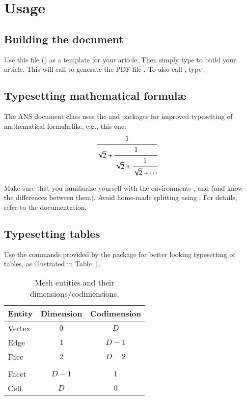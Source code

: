 \documentclass{ansarticle}
\begin{document}
\section{Usage}

\subsection{Building the document}

Use this file () as a template for your article. Then
simply type  to build your article. This will call
 to generate the PDF file . To also call
, type .

\subsection{Typesetting mathematical formul\ae}

The ANS document class uses the  and 
packages for improved typesetting of mathematical formul\ae like,
e.g., this one:
\begin{equation}
  \cfrac{1}{\sqrt{2}+
    \cfrac{1}{\sqrt{2}+
      \cfrac{1}{\sqrt{2}+\dotsb
  }}}.
\end{equation}

Make sure that you familiarize yourself with the 
environments ,  and  (and know the
differences between them). Avoid home-made splitting using
. For details, refer to the 
documentation.

\subsection{Typesetting tables}

Use the commands provided by the  package for better
looking typesetting of tables, as illustrated in
Table~\ref{tab:tableexample}.

\begin{table}
  \begin{center}
    \begin{tabular}{lcc}
      \toprule
      Entity & Dimension & Codimension \\
      \hline
      Vertex & $0$ & $D$ \\
      Edge & $1$ & $D-1$ \\
      Face & $2$ & $D-2$ \\
      & & \\
      Facet & $D-1$ & $1$ \\
      Cell & $D$ & $0$ \\
      \bottomrule
    \end{tabular}
  \end{center}
    \caption{Mesh entities and their dimensions/codimensions.}
    \label{tab:tableexample}
\end{table}
\end{document}
